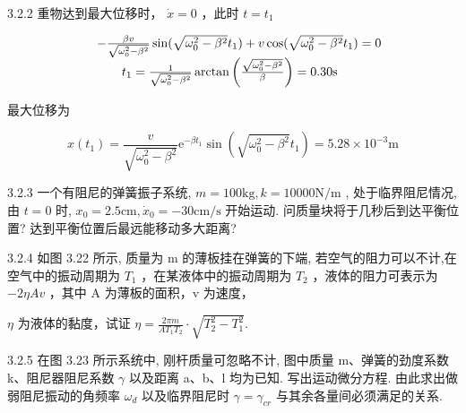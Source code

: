 \begin{problem}{3.2.2}
重物达到最大位移时， $\dot{x} = 0$ ，此时 $t = t_1$ 

\[
\begin{array}{r l} & {- \frac {\beta v}{\sqrt {\omega_ {0} ^ {2} - \beta^ {2}}} \sin (\sqrt {\omega_ {0} ^ {2} - \beta^ {2}} t _ {1}) + v \cos (\sqrt {\omega_ {0} ^ {2} - \beta^ {2}} t _ {1}) = 0} \\ & {\qquad t _ {1} = \frac {1}{\sqrt {\omega_ {0} ^ {2} - \beta^ {2}}} \arctan \left(\frac {\sqrt {\omega_ {0} ^ {2} - \beta^ {2}}}{\beta}\right) = 0. 3 0 \mathrm{s}} \end{array}
\]

最大位移为

\[
x \left(t _ {1}\right) = \frac {v}{\sqrt {\omega_ {0} ^ {2} - \beta^ {2}}} \mathrm{e} ^ {- \beta t _ {1}} \sin \left(\sqrt {\omega_ {0} ^ {2} - \beta^ {2}} t _ {1}\right) = 5. 2 8 \times 1 0 ^ {- 3} \mathrm{m}
\]
\begin{center}

\end{center}
\end{problem}
\clearpage


\begin{problem}{3.2.3}
一个有阻尼的弹簧振子系统, $m = 100\mathrm{kg}, k = 10000\mathrm{N / m}$ , 处于临界阻尼情况,由 $t = 0$ 时, $x_0 = 2.5\mathrm{cm}, \dot{x}_0 = -30\mathrm{cm / s}$ 开始运动. 问质量块将于几秒后到达平衡位置? 达到平衡位置后最远能移动多大距离?
\end{problem}
\clearpage


\begin{problem}{3.2.4}
如图 3.22 所示, 质量为 m 的薄板挂在弹簧的下端, 若空气的阻力可以不计,在空气中的振动周期为 $T_{1}$ ，在某液体中的振动周期为 $T_{2}$ ，液体的阻力可表示为 $-2\eta A v$ ，其中 A 为薄板的面积，v 为速度，

$\eta$ 为液体的黏度，试证 $\eta = \frac{2\pi m}{AT_1T_2}\cdot \sqrt{T_2^2 - T_1^2}.$
\begin{center}

\end{center}
\end{problem}
\clearpage


\begin{problem}{3.2.5}
在图 3.23 所示系统中, 刚杆质量可忽略不计, 图中质量 m、弹簧的劲度系数 k、阻尼器阻尼系数 $\gamma$ 以及距离 a、b、l 均为已知. 写出运动微分方程. 由此求出做弱阻尼振动的角频率 $\omega_{d}$ 以及临界阻尼时 $\gamma = \gamma_{cr}$ 与其余各量间必须满足的关系.
\begin{center}

\end{center}
\end{problem}
\clearpage


